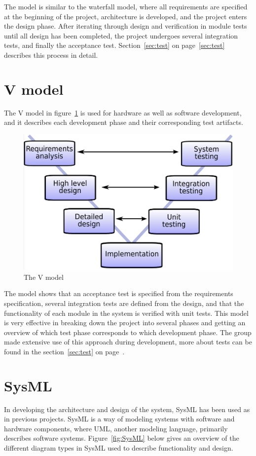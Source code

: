 The model is similar to the waterfall model, where all requirements are specified at the beginning of the project, architecture is developed, and the project enters the design phase. After iterating through design and verification in module tests until all design has been completed, the project undergoes several integration tests, and finally the acceptance test. Section~\ref{sec:test} on page~\ref{sec:test} describes this process in detail.

\section{V model}
The V model in figure~\ref{fig:V_model} is used for hardware as well as software development, and it describes each development phase and their corresponding test artifacts. 

\begin{figure}[H]
	\centering
	\includegraphics[max width=0.7\linewidth]{V_model.png}
	\caption{The V model\cite{V_model}}
	\label{fig:V_model}
\end{figure}

The model shows that an acceptance test is specified from the requirements specification, several integration tests are defined from the design, and that the functionality of each module in the system is verified with unit tests. This model is very effective in breaking down the project into several phases and getting an overview of which test phase corresponds to which development phase. The group made extensive use of this approach during development, more about tests can be found in the section~\ref{sec:test} on page~\pageref{sec:test}.

\section{SysML}

In developing the architecture and design of the system, SysML has been used as in previous projects. SysML is a way of modeling systems with software and hardware components, where UML, another modeling language, primarily describes software systems. Figure~\ref{fig:SysML} below gives an overview of the different diagram types in SysML used to describe functionality and design.

